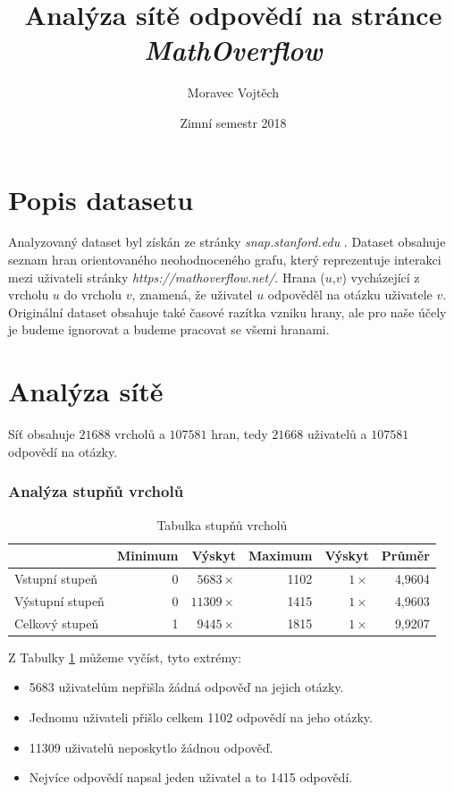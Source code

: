 \documentclass[a4paper,12pt]{article}
\author{Moravec Vojtěch}
\title{Analýza sítě odpovědí na stránce \emph{MathOverflow}}
\date{Zimní semestr 2018}
\begin{document}
\maketitle
\newpage

\section{Popis datasetu}

Analyzovaný dataset byl získán ze stránky \emph{snap.stanford.edu} \cite{snapnets}. Dataset obsahuje
seznam hran orientovaného neohodnoceného grafu, který reprezentuje interakci mezi uživateli stránky
 \emph{https://mathoverflow.net/}. Hrana ($u$,$v$) vycházející z vrcholu $u$ do vrcholu $v$, znamená, že
 uživatel $u$ odpověděl na otázku uživatele $v$. Originální dataset obsahuje také časové razítka vzniku
 hrany, ale pro naše účely je budeme ignorovat a budeme pracovat se všemi hranami.
 
\section{Analýza sítě}
Síť obsahuje $21 688$ vrcholů a $107 581$ hran, tedy $21 668$ uživatelů a $107 581$ odpovědí na otázky.

\subsubsection{Analýza stupňů vrcholů}
\begin{table}[h!]
\centering
\begin{tabular}{l | r | r | r | r | r}
 				& Minimum & Výskyt	& Maximum & Výskyt	& Průměr \\
\hline
Vstupní stupeň 	& 0 & $5683 \times$	& 1102 	& 	$1 \times$	& 4,9604 \\
Výstupní stupeň & 0 & $11309 \times$& 1415 	& 	$1 \times$	& 4,9603 \\
Celkový stupeň  & 1	& $9445 \times$	& 1815	&	$1 \times$	& 9,9207
\end{tabular}
\caption{Tabulka stupňů vrcholů}
\label{tab:degree}
\end{table}

Z Tabulky \ref{tab:degree} můžeme vyčíst, tyto extrémy:
\begin{itemize}
\item 5683 uživatelům nepřišla žádná odpověď na jejich otázky.
\item Jednomu uživateli přišlo celkem 1102 odpovědí na jeho otázky.
\item 11309 uživatelů neposkytlo žádnou odpověď.
\item Nejvíce odpovědí napsal jeden uživatel a to 1415 odpovědí.
\end{itemize}
\end{document}
